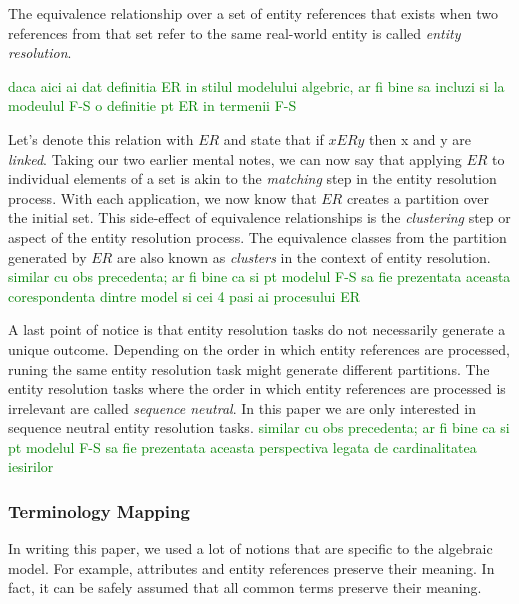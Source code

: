 \documentclass[journal]{IEEEtran}
\begin{document}
    \begin{defn}
        The equivalence relationship over a set of entity references that exists
        when two references from that set refer to the same real-world entity is
        called \textit{entity resolution}.
    \end{defn}
    \textcolor{green}{daca aici ai dat definitia ER in stilul modelului algebric, ar fi bine sa incluzi si la modeulul F-S o definitie pt ER in termenii F-S}



    Let's denote this relation with $ER$ and state that if $xERy$ then x and y
    are \textit{linked}\cite{Tal11}.
    Taking our two earlier mental notes, we can now say that applying $ER$ to
    individual elements of a set is akin to the \textit{matching} step in the
    entity resolution process.
    With each application, we now know that $ER$ creates a partition over the
    initial set.
    This side-effect of equivalence relationships is the \textit{clustering}
    step or aspect of the entity resolution process.
    The equivalence classes from the partition generated by $ER$ are also known
    as \textit{clusters} in the context of entity resolution.
    \textcolor{green}{similar cu obs precedenta; ar fi bine ca si pt modelul F-S sa fie prezentata aceasta corespondenta dintre model si cei 4 pasi ai procesului ER}

    A last point of notice is that entity resolution tasks do not necessarily
    generate a unique outcome\cite{Tal11}.
    Depending on the order in which entity references are processed, runing the
    same entity resolution task might generate different partitions.
    The entity resolution tasks where the order in which entity references are
    processed is irrelevant are called \textit{sequence neutral}\cite{Tal11}.
    In this paper we are only interested in sequence neutral entity resolution
    tasks.
    \textcolor{green}{similar cu obs precedenta; ar fi bine ca si pt modelul F-S sa fie prezentata aceasta perspectiva legata de cardinalitatea iesirilor}

    \subsubsection[algrel]{Terminology Mapping}\label{subsubsec:algrel}

    In writing this paper, we used a lot of notions that are specific to the
    algebraic model.
    For example, attributes and entity references preserve their meaning.
    In fact, it can be safely assumed that all common terms preserve their
    meaning.
    
\end{document}
